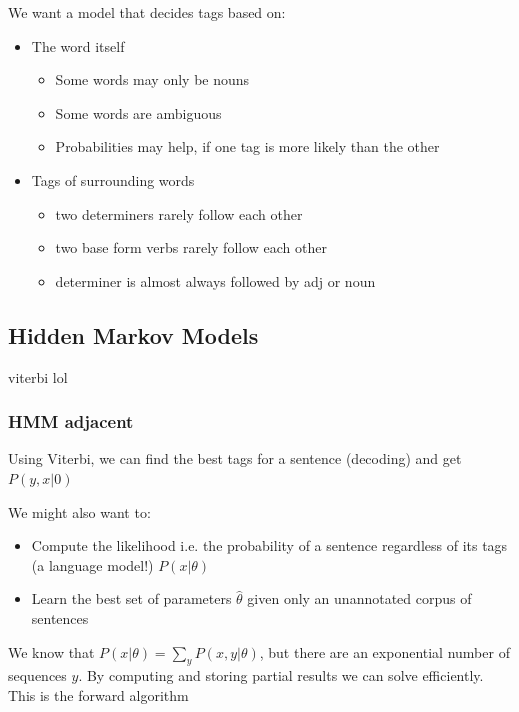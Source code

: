 \documentclass[landscape, 8pt]{extarticle}
\begin{document}
\begin{multicols}{3}
We want a model that decides tags based on:
\begin{itemize}
    \setlength\itemsep{0em}
    \item The word itself
        \begin{itemize}
            \setlength\itemsep{0em}
            \item Some words may only be nouns
            \item Some words are ambiguous
            \item Probabilities may help, if one tag is more likely than the other
        \end{itemize}
    \item Tags of surrounding words
        \begin{itemize}
            \setlength\itemsep{0em}
            \item two determiners rarely follow each other
            \item two base form verbs rarely follow each other
            \item determiner is almost always followed by adj or noun
        \end{itemize}
\end{itemize}

\subsection{Hidden Markov Models}
viterbi lol

\subsubsection{HMM adjacent}
Using Viterbi, we can find the best tags for a sentence (decoding) and get $P(y, x|0)$

We might also want to:
\begin{itemize}
    \setlength\itemsep{0em}
    \item Compute the likelihood i.e. the probability of a sentence regardless of its tags (a language model!) $P(x | \theta)$
    \item Learn the best set of parameters $\hat{\theta}$ given only an unannotated corpus of sentences
\end{itemize}

We know that $P(x | \theta) = \sum_{y} P(x, y | \theta)$, but there are an exponential number of sequences $y$. By computing and storing partial results we can solve efficiently. This is the forward algorithm


\end{multicols}
\end{document}
